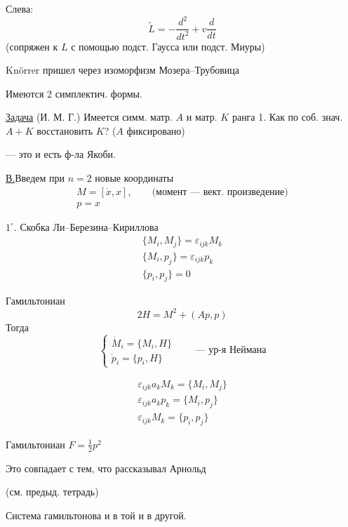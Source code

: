Слева:
\begin{equation*}
\widetilde L=-\frac{d^2}{dt^2}+v\frac{d}{dt}
\tag{5}
\end{equation*}
(сопряжен к \(L\) с помощью подст. Гаусса или подст. Миуры)

Knörrer пришел через изоморфизм Мозера--Трубовица


Имеются 2 симплектич. формы.

\uline{Задача} (И. М. Г.) Имеется симм. матр. \(A\) и матр. \(K\) ранга 1.
Как по соб. знач. \(A+K\) восстановить \(K\)? (\(A\) фиксировано)

--- это и есть ф-ла Якоби.

\uline{В.}\quad Введем при \(n=2\) новые координаты
\begin{gather*}
M=[\dot x,x],\qquad\text{(момент --- вект. произведение)}\\
p=x
\end{gather*}

\(1^{\circ}\). Скобка Ли--Березина--Кириллова
\begin{gather*}
\{M_i,M_j\}=\varepsilon_{ijk}M_k\\
\{M_i,p_j\}=\varepsilon_{ijk}p_k\\
\{p_i,p_j\}=0
\end{gather*}

Гамильтониан
\[
2H=M^2+(Ap,p)
\]
Тогда
\[
\begin{cases}
\dot M_i=\{M_i,H\}\\
\dot p_i=\{p_i,H\}
\end{cases}
\qquad\text{--- ур-я Неймана}
\]

\begin{gather*}
\varepsilon_{ijk}a_kM_k=\{M_i,M_j\}\\
\varepsilon_{ijk}a_kp_k=\{M_i,p_j\}\\
\varepsilon_{ijk}M_k=\{p_i,p_j\}
\end{gather*}

Гамильтониан \(F=\frac12p^2\)

\quad Это совпадает с тем, что рассказывал Арнольд

(см. предыд. тетрадь)

Система гамильтонова и в той и в другой.


